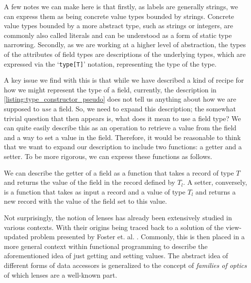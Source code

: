 \begin{listing}[ht!]
  
  \caption{Field type constructor pseudocode}
  \label{listing:type_constructor_pseudo}
\end{listing}

A few notes we can make here is that firstly, as labels are generally strings, we can express them as being concrete value types bounded by strings. Concrete value types bounded by a more abstract type, such as strings or integers, are commonly also called literals and can be understood as a form of static type narrowing. Secondly, as we are working at a higher level of abstraction, the types of the attributes of field types are descriptions of the underlying types, which are expressed via the `\texttt{type[T]}' notation, representing the type of the type.

A key issue we find with this is that while we have described a kind of recipe for how we might represent the type of a field, currently, the description in \ref{listing:type_constructor_pseudo} does not tell us anything about how we are supposed to \textit{use} a field. So, we need to expand this description; the somewhat trivial question that then appears is, what does it mean to use a field type? We can quite easily describe this as an operation to retrieve a value from the field and a way to set a value in the field. Therefore, it would be reasonable to think that we want to expand our description to include two functions: a getter and a setter. To be more rigorous, we can express these functions as follows.

\begin{definition}
 We can describe the getter of a field as a function that takes a record of type $T$ and returns the value of the field in the record defined by $T_l$. A setter, conversely, is a function that takes as input a record and a value of type $T_l$ and returns a new record with the value of the field set to this value.
  
  
  
 Not surprisingly, the notion of lenses has already been extensively studied in various contexts. With their origins being traced back to a solution of the view-updated problem presented by Foster et. al. \cite{Foster2005Combinators}. Commonly, this is then placed in a more general context within functional programming to describe the aforementioned idea of just getting and setting values. The abstract idea of different forms of data accessors is generalized to the concept of \textit{families of optics} of which lenses are a well-known part. \cite{Clarke2024Profunctor}
\end{definition}

